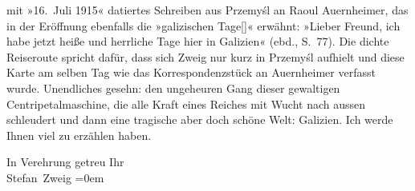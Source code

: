 {{{                  mit »16. Juli 1915« datiertes Schreiben aus Przemyśl
                  an Raoul Auernheimer, das in der Eröffnung 
                  ebenfalls die »galizischen Tage[]« erwähnt: »Lieber Freund, ich habe jetzt heiße und herrliche Tage hier in Galizien«
                   (ebd., S. 77). Die dichte Reiseroute spricht dafür, dass sich Zweig nur
                  kurz in Przemyśl aufhielt und diese Karte am selben Tag
                  wie das Korrespondenzstück an Auernheimer verfasst wurde.}}}\label{K_L03656-2}
               Unendliches gesehn: den ungeheuren Gang dieser gewaltigen Centripetalmaschine, die
               alle Kraft eines Reiches mit Wucht nach aussen schleudert und dann eine tragische
               aber doch schöne Welt: Galizien. Ich werde Ihnen
               viel zu erzählen haben.\pend
           
\pstart
           In Verehrung getreu Ihr{\\[\baselineskip]}\spacefill\mbox{Stefan Zweig}\pend
           \leftskip=0em{}\endnumbering{}  \newcommand{\dateiname}{L03656}\newcommand{\titel}{Stefan Zweig an Arthur Schnitzler, [17. 7. 1915?]}\newcommand{\editorInnen}{Selma Jahnke und Martin Anton Müller}
